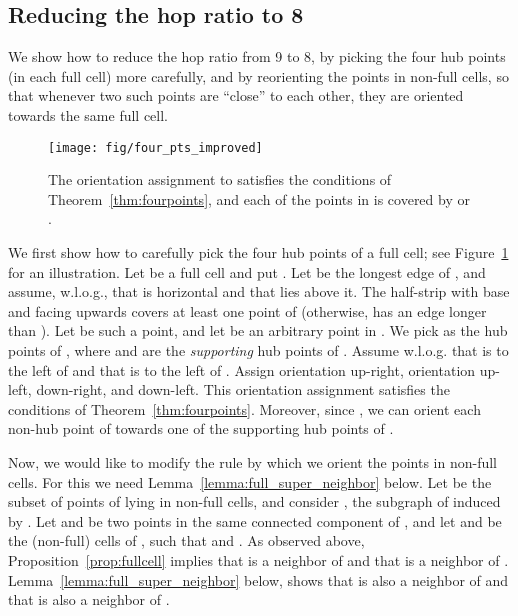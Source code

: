 \documentclass[11pt,letter]{article}
\begin{document}
\subsection{Reducing the hop ratio to 8}\label{subsec:reducing_hops}

We show how to reduce the hop ratio from 9 to 8, by picking the four hub points (in each full cell) more carefully, and by reorienting the points in non-full cells, so that whenever two such points are ``close'' to each other, they are oriented towards the same full cell.


\begin{figure}[htp]
   \centering
       \texttt{[image: fig/four\_pts\_improved]}
   \caption{The orientation assignment to  satisfies the conditions of Theorem~\ref{thm:fourpoints},
   and each of the points in  is covered by  or .}
   \label{fig:four_pts_improved}
\end{figure}




We first show how to carefully pick the four hub points of a full cell; see Figure~\ref{fig:four_pts_improved} for an illustration.
Let  be a full cell and put . Let  be the longest edge of , and assume, w.l.o.g., that  is horizontal and that  lies above it.
The half-strip with base  and facing upwards
covers at least one point of 
(otherwise,  has an edge longer than ). Let  be such a point, and let  be an arbitrary point in
. We pick  as the hub points of , where
 and  are the {\em supporting} hub points of .
Assume w.l.o.g. that  is to the left of  and that  is to the left of .
Assign  orientation up-right,  orientation up-left,  down-right, and  down-left.
This orientation assignment satisfies the conditions of Theorem~\ref{thm:fourpoints}.
Moreover, since , we can orient each non-hub point of 
towards one of the supporting hub points of .


Now, we would like to modify the rule by which we orient the points in non-full cells. For this we need Lemma~\ref{lemma:full_super_neighbor} below.
Let  be the subset of points of  lying in non-full cells, and
consider , the subgraph of  induced by .
Let  and  be two points in the same connected component of ,
and let  and  be the (non-full) cells of , such that  and .
As observed above, Proposition~\ref{prop:fullcell} implies that  is a neighbor of  and that  is a neighbor of .
Lemma~\ref{lemma:full_super_neighbor} below, shows that  is also a neighbor of  and that  is also a neighbor of .
\end{document}
